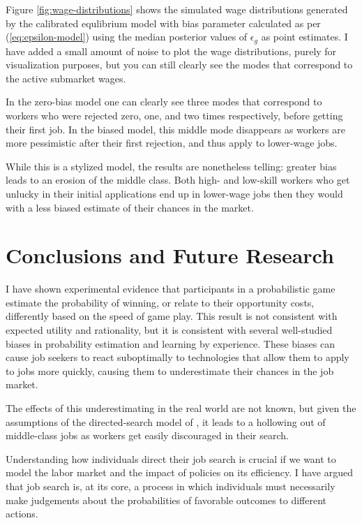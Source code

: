 \documentclass[a4paper,12pt]{article}
\begin{document}
Figure \ref{fig:wage-distributions} shows the simulated wage distributions generated by the calibrated equlibrium model with bias parameter calculated as per (\ref{eq:epsilon-model}) using the median posterior values of $\epsilon_g$ as point estimates. I have added a small amount of noise to plot the wage distributions, purely for visualization purposes, but you can still clearly see the modes that correspond to the active submarket wages.

In the zero-bias model one can clearly see three modes that correspond to workers who were rejected zero, one, and two times respectively, before getting their first job. In the biased model, this middle mode disappears as workers are more pessimistic after their first rejection, and thus apply to lower-wage jobs.

While this is a stylized model, the results are nonetheless telling: greater bias leads to an erosion of the middle class. Both high- and low-skill workers who get unlucky in their initial applications end up in lower-wage jobs then they would with a less biased estimate of their chances in the market.

\section{ Conclusions and Future Research }

I have shown experimental evidence that participants in a probabilistic game estimate the probability of winning, or relate to their opportunity costs, differently based on the speed of game play. This result is not consistent with expected utility and rationality, but it is consistent with several well-studied biases in probability estimation and learning by experience. These biases can cause job seekers to react suboptimally to technologies that allow them to apply to jobs more quickly, causing them to underestimate their chances in the job market.

The effects of this underestimating in the real world are not known, but given the assumptions of the directed-search model of \cite{gonzalez2010}, it leads to a hollowing out of middle-class jobs as workers get easily discouraged in their search.

Understanding how individuals direct their job search is crucial if we want to model the labor market and the impact of policies on its efficiency. I have argued that job search is, at its core, a process in which individuals must necessarily make judgements about the probabilities of favorable outcomes to different actions.
\end{document}
